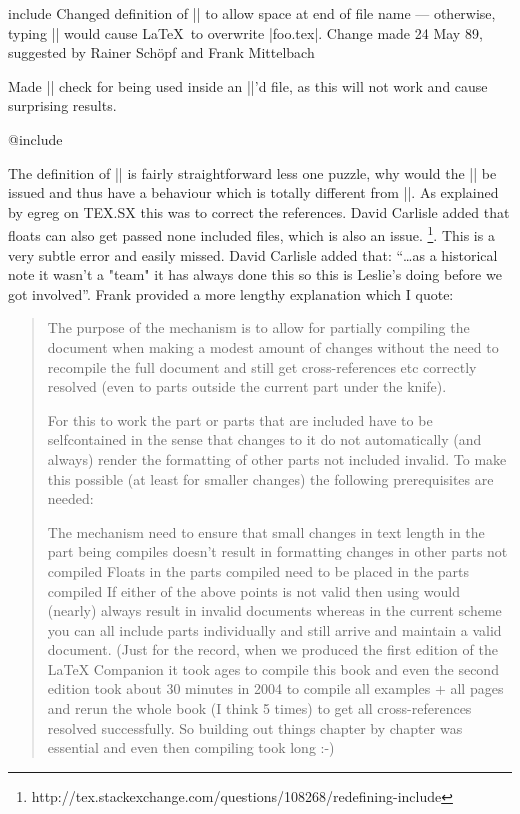 \begin{multicols}
\begin{docCommand}{include}{}
 Changed definition of || to allow space at end of file name
 --- otherwise, typing || would cause \LaTeX\ to
 overwrite |foo.tex|.  Change made 24 May 89, suggested by Rainer
 Sch\"opf  and Frank Mittelbach

 Made || check for being used inside an ||'d file, as
 this will not work and cause surprising results.
\end{docCommand}
%
 \begin{docCommand}{@include}{}
 
 The definition of |\@include| is fairly
 straightforward less one puzzle, why would the |\clearpage| be
 issued and thus have a behaviour which is totally different from
 ||. As explained by egreg on TEX.SX this was to correct the references.
 David Carlisle added that floats can also get passed none included
 files, which is also an issue.
 \footnote{http://tex.stackexchange.com/questions/108268/redefining-include}. This is a very subtle error and easily missed. David Carlisle added that: ``\ldots as a historical note it wasn't a "team" it has always done this so this is Leslie's doing before we got involved''.
Frank provided a more lengthy explanation which I quote:
\begin{quotation}
The purpose of the  mechanism is to allow for partially compiling the document when making a modest amount of changes without the need to recompile the full document and still get cross-references etc correctly resolved (even to parts outside the current part under the knife).

For this to work the part or parts that are included have to be selfcontained in the sense that changes to it do not automatically (and always) render the formatting of other parts not included invalid. To make this possible (at least for smaller changes) the following prerequisites are needed:

The mechanism need to ensure that small changes in text length in the part being compiles doesn't result in formatting changes in other parts not compiled
Floats in the parts compiled need to be placed in the parts compiled
If either of the above points is not valid then using  would (nearly) always result in invalid documents whereas in the current scheme you can all include parts individually and still arrive and maintain a valid document. (Just for the record, when we produced the first edition of the LaTeX Companion it took ages to compile this book and even the second edition took about 30 minutes in 2004 to compile all examples + all pages and rerun the whole book (I think 5 times) to get all cross-references resolved successfully. So building out things chapter by chapter was essential and even then compiling took long :-)


\end{quotation}
\end{docCommand}
\end{multicols}
